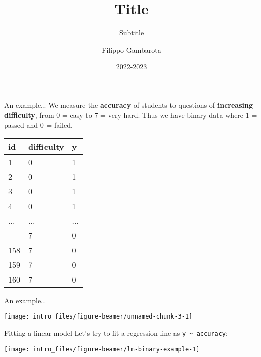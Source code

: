 \documentclass[
  ignorenonframetext,
]{beamer}
\title{Title}
\subtitle{Subtitle}
\author{Filippo Gambarota}
\date{2022-2023}
\begin{document}
\frame{\titlepage}

\begin{frame}{An example\ldots{}}
\protect\hypertarget{an-example}{}
We measure the \textbf{accuracy} of students to questions of
\textbf{increasing difficulty}, from 0 = easy to 7 = very hard. Thus we
have binary data where 1 = passed and 0 = failed.

\begin{table}
\centering\begingroup\fontsize{7}{9}\selectfont

\begin{tabular}{lll}
\toprule
\textbf{id} & \textbf{difficulty} & \textbf{y}\\
\midrule
1 & 0 & 1\\
2 & 0 & 1\\
3 & 0 & 1\\
4 & 0 & 1\\
... & ... & ...\\
\addlinespace
157 & 7 & 0\\
158 & 7 & 0\\
159 & 7 & 0\\
160 & 7 & 0\\
\bottomrule
\end{tabular}
\endgroup{}
\end{table}
\end{frame}

\begin{frame}{An example\ldots{}}
\protect\hypertarget{an-example-1}{}
\begin{center}\texttt{[image: intro\_files/figure-beamer/unnamed-chunk-3-1]} \end{center}
\end{frame}

\begin{frame}[fragile]{Fitting a linear model}
\protect\hypertarget{fitting-a-linear-model}{}
Let's try to fit a regression line as
\texttt{y\ \textasciitilde{}\ accuracy}:

\begin{center}\texttt{[image: intro\_files/figure-beamer/lm-binary-example-1]} \end{center}
\end{frame}
\end{document}
